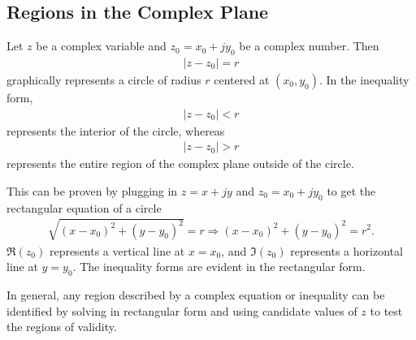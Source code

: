 \documentclass{report}
\begin{document}
\subsection*{Regions in the Complex Plane}
Let $z$ be a complex variable and $z_0=x_0+jy_0$ be a complex number. Then 
\begin{align}
    |z-z_0| = r
\end{align} 
graphically represents a circle of radius $r$ centered at $(x_0,y_0)$. In the inequality form,
\begin{align}
    |z-z_0| < r
\end{align} 
represents the interior of the circle, whereas 
\begin{align}
    |z-z_0| > r
\end{align} 
represents the entire region of the complex plane outside of the circle. 
\begin{center}
\end{center}
This can be proven by plugging in $z=x+jy$ and $z_0=x_0+jy_0$ to get the rectangular equation of a circle
\begin{align}
    \sqrt{(x-x_0)^2+(y-y_0)^2} = r \Longrightarrow (x-x_0)^2+(y-y_0)^2 = r^2.
\end{align} 
$\Re(z_0)$ represents a vertical line at $x=x_0$, and $\Im(z_0)$ represents a horizontal line at $y=y_0$. The inequality forms 
are evident in the rectangular form.
\begin{center}
\end{center}
In general, any region described by a complex equation or inequality can be identified by solving in rectangular form and using candidate values of $z$ 
to test the regions of validity.
\end{document}
